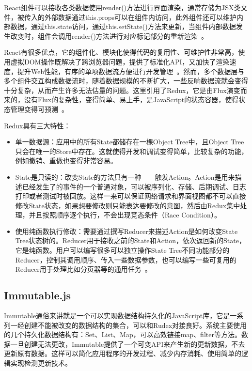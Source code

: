 React组件可以接收各类数据使用render()方法进行界面渲染，通常存储为JSX类文件，被传入的外部数据通过this.props可以在组件内访问，此外组件还可以维护内部数据，通过this.state访问，通过this.setState()方法来更新，当组件内部数据发生改变时，组件会调用render()方法进行对应标记部分的重新渲染~\cite{sutcliffe1983antibodies}。

React有很多优点，它的组件化、模块化使得代码的复用性、可维护性非常高，使用虚拟DOM操作既解决了跨浏览器问题，提供了标准化API，又加快了渲染速度，提升Web性能，有序的单项数据流方便进行开发管理~\cite{chinnathambi2018learning}。然而，多个数据层与多个组件交互构成数据流时，随着数据规模的不断扩大，一些反响数据流就会变得十分复杂，从而产生许多无法估量的问题。这里引用了Redux，它是由Flux演变而来的，没有Flux的复杂性，变得简单、易上手，是JavaScript的状态容器，使得状态管理变得可预测~\cite{master2016}。

Redux具有三大特性：
\begin{itemize}
    \item 单一数据源：应用中的所有State都储存在一棵Object Tree中，且Object Tree只会在唯一的Store中存在。这就使得开发和调试变得简单，比较复杂的功能，例如撤销、重做也变得非常容易。
    \item State是只读的：改变State的方法只有一种——触发Action。Action是用来描述已经发生了的事件的一个普通对象，可以被序列化、存储、后期调试、日志打印或者测试时被回放。这样一来可以保证网络请求和界面视图都不可以直接修改State状态，如果想要修改则只能表达要修改的意图，然后由Redux集中处理，并且按照顺序逐个执行，不会出现竞态条件（Race Condition）。
    \item 使用纯函数执行修改：需要通过撰写Reducer来描述Action是如何改变State Tree状态树的。Reducer用于接收之前的State和Action，依次返回新的State，它是纯函数。用户可以编写很多可以独立操作State Tree不同功能部分的Reducer，控制其调用顺序、传入一些数据参数，也可以编写一些可复用的Reducer用于处理比如分页器等的通用任务~\cite{mardan2017react}。\\
\end{itemize}

\subsection{Immutable.js}
Immutable通俗来讲就是一个可以实现数据结构持久化的JavaScript库，它是一系列一经创建不能被改变的数据结构的集合，可以和Rudex对接良好。系统主要使用的几个持久化数据结构有：Set、List、Map，可以高效链接map、filter等方法。数据一旦创建无法更改，Immutable提供了一个可变API来产生新的更新数据，不去更新原有数据。这样可以简化应用程序的开发过程、减少内存消耗、使用简单的逻辑实现检测更新技术。\\

